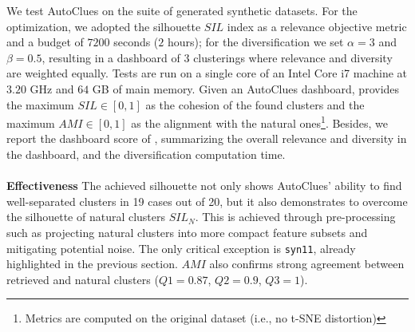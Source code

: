 \documentclass[runningheads]{llncs}
\begin{document}
We test AutoClues on the suite of generated synthetic datasets.
For the optimization, we adopted the silhouette $SIL$ index as a relevance objective metric and a budget of $7200$ seconds ($2$ hours); for the diversification we set $\alpha=3$ and $\beta=0.5$, resulting in a dashboard of $3$ clusterings where relevance and diversity are weighted equally.
Tests are run on a single core of an Intel Core i7 machine at $3.20$ GHz and $64$ GB of main memory.
%
Given an AutoClues dashboard,  provides
the maximum $SIL\in [0, 1]$ as the cohesion of the found clusters and the maximum $AMI \in [0, 1]$ as the alignment with the natural ones\footnote{Metrics are computed on the original dataset (i.e., no t-SNE distortion)}. Besides, we report the dashboard score of , summarizing the overall relevance and diversity in the dashboard, and the diversification computation time.
\\
\\
\textbf{Effectiveness}
The achieved silhouette not only shows AutoClues' ability to find well-separated clusters in 19 cases out of 20, but it also demonstrates to overcome the silhouette of natural clusters $SIL_N$. 
This is achieved through pre-processing such as projecting natural clusters into more compact feature subsets and mitigating potential noise.
The only critical exception is \texttt{syn11}, already highlighted in the previous section. 
$AMI$ also confirms strong agreement between retrieved and natural clusters ($Q1=0.87$, $Q2=0.9$, $Q3=1$). 
\end{document}

